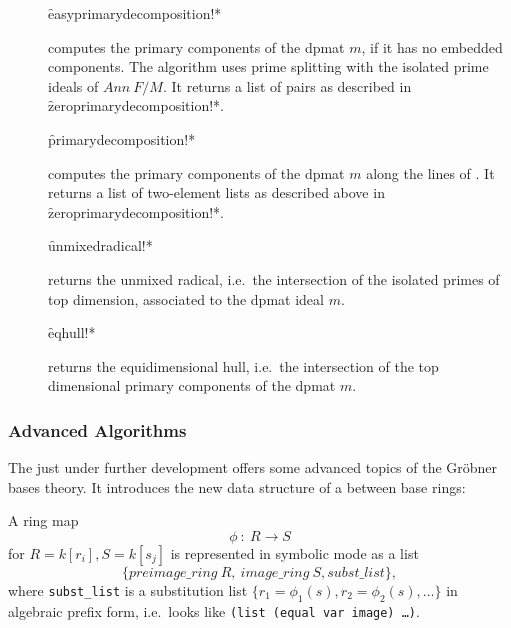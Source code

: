 \begin{description}
\item[]
  \begin{syntax}
    \f{easyprimarydecomposition!*} 
  \end{syntax}
  \hypertarget{procedure:EASYPRIMARYDECOMPOSITION!*}{}
computes the primary components of the dpmat $m$, if it has no
embedded components. The algorithm uses prime splitting with the
isolated prime ideals of $Ann\ F/M$. It returns a list of pairs as described in
\f{zeroprimarydecomposition!*}.

\item[]
  \begin{syntax}
    \f{primarydecomposition!*} 
  \end{syntax}
  \hypertarget{procedure:PRIMARYDECOMPOSITION!*}{}
computes the primary components of the dpmat $m$ along the lines
  of \cite{Gianni:88}. It returns a list of two-element lists as described above in
  \f{zeroprimarydecomposition!*}.

\item[]
  \begin{syntax}
    \f{unmixedradical!*} 
  \end{syntax}
  \hypertarget{procedure:UNMIXEDRADICAL!*}{}
returns the unmixed radical, i.e.\ the intersection of the
isolated primes of top dimension, associated to the dpmat ideal $m$.

\item[]
  \begin{syntax}
    \f{eqhull!*} 
  \end{syntax}
  \hypertarget{procedure:EQHULL!*}{}
returns the equidimensional hull, i.e.\ the intersection of the
 top dimensional primary components of the dpmat $m$.
\end{description}

\subsubsection{Advanced Algorithms}

The  just under further development offers some
advanced topics of the Gr\"obner bases theory. It introduces the new data
structure of a  between base rings:
\medskip

A ring map
\[ \phi\ :\ R\longrightarrow S\]
for $R=k[r_i], S=k[s_j]$ is represented in symbolic mode as a list
\[   \{preimage\_ring\ R,\ image\_ring\ S, subst\_list\},\]
where \texttt{subst\_list} is a substitution list $\{r_1=\phi_1(s),
r_2=\phi_2(s),\ldots \}$ in algebraic prefix form, i.e.\ looks like
\texttt{(list (equal var image) \ldots )}.

